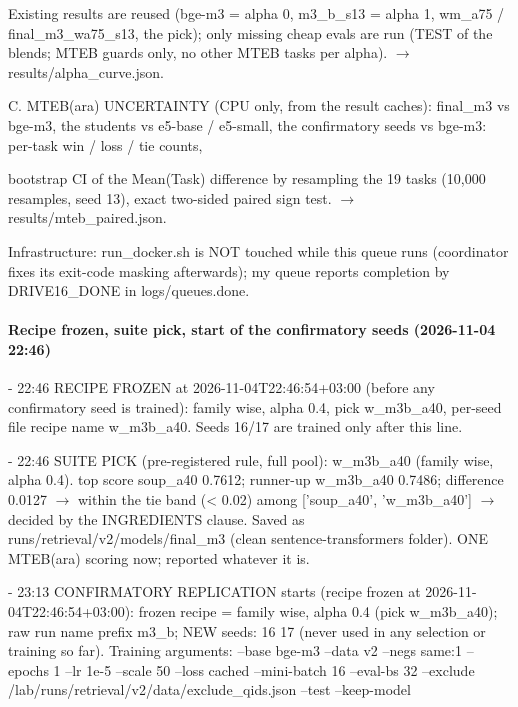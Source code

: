 {Existing results are reused (bge-m3 = alpha 0, m3\_b\_s13 = alpha 1, wm\_a75 / final\_m3\_wa75\_s13, the pick); only missing cheap evals are run (TEST of the blends; MTEB guards only, no other MTEB tasks per alpha). $\to$ results/alpha\_curve.json.

C. MTEB(ara) UNCERTAINTY (CPU only, from the result caches): final\_m3 vs bge-m3, the students vs e5-base / e5-small, the confirmatory seeds vs bge-m3: per-task win / loss / tie counts,

bootstrap CI of the Mean(Task) difference by resampling the 19 tasks (10,000 resamples, seed 13), exact two-sided paired sign test. $\to$ results/mteb\_paired.json.

Infrastructure: run\_docker.sh is NOT touched while this queue runs (coordinator fixes its exit-code masking afterwards); my queue reports completion by DRIVE16\_DONE in logs/queues.done.\par}

\paragraph{Recipe frozen, suite pick, start of the confirmatory seeds (2026-11-04 22:46)}
{\footnotesize\raggedright
- 22:46 RECIPE FROZEN at 2026-11-04T22:46:54+03:00 (before any confirmatory seed is trained): family wise, alpha 0.4, pick w\_m3b\_a40, per-seed file recipe name w\_m3b\_a40. Seeds 16/17 are trained only after this line.

- 22:46 SUITE PICK (pre-registered rule, full pool): w\_m3b\_a40 (family wise, alpha 0.4). top score soup\_a40 0.7612; runner-up w\_m3b\_a40 0.7486; difference 0.0127 $\to$ within the tie band (< 0.02) among ['soup\_a40', 'w\_m3b\_a40'] $\to$ decided by the INGREDIENTS clause. Saved as runs/retrieval/v2/models/final\_m3 (clean sentence-transformers folder). ONE MTEB(ara) scoring now; reported whatever it is.

- 23:13 CONFIRMATORY REPLICATION starts (recipe frozen at 2026-11-04T22:46:54+03:00): frozen recipe = family wise, alpha 0.4 (pick w\_m3b\_a40); raw run name prefix m3\_b; NEW seeds: 16 17 (never used in any selection or training so far). Training arguments: --base bge-m3 --data v2 --negs same:1 --epochs 1 --lr 1e-5 --scale 50 --loss cached --mini-batch 16 --eval-bs 32 --exclude /lab/runs/retrieval/v2/data/exclude\_qids.json --test --keep-model\par}

